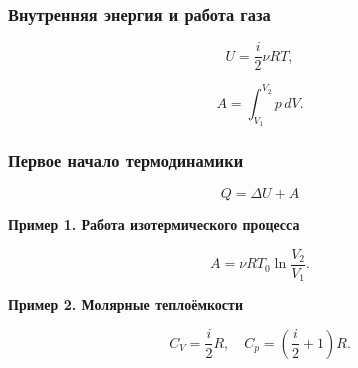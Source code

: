 \documentclass[12pt, a4paper]{article}
\begin{document}
\subsubsection*{Внутренняя энергия и работа газа}

\[
U = \frac{i}{2} \nu R T,
\]

\[
A = \int_{V_1}^{V_2} p\, dV.
\]

\subsubsection*{Первое начало термодинамики}

\[
\boxed{Q = \Delta U + A}
\]

\textbf{Пример 1. Работа изотермического процесса}

\[
A = \nu R T_0 \ln \frac{V_2}{V_1}.
\]

\textbf{Пример 2. Молярные теплоёмкости}

\[
C_V = \frac{i}{2} R, \quad C_p = \left(\frac{i}{2} + 1\right) R.
\]
\end{document}

